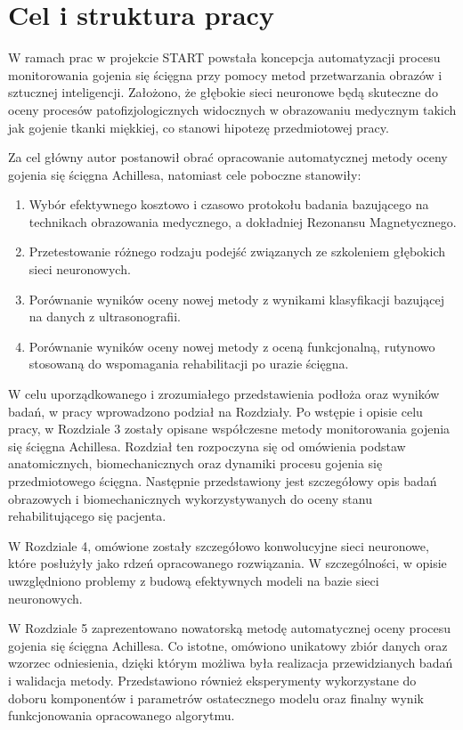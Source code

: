 {\let\clearpage\relax\chapter*{Cel i struktura pracy}}

W ramach prac w projekcie START powstała koncepcja automatyzacji procesu monitorowania gojenia się ścięgna przy pomocy metod przetwarzania obrazów i sztucznej inteligencji. Założono, że głębokie sieci neuronowe będą skuteczne do oceny procesów patofizjologicznych widocznych w obrazowaniu medycznym takich jak gojenie tkanki miękkiej, co stanowi hipotezę przedmiotowej pracy.

Za cel główny autor postanowił obrać opracowanie automatycznej metody oceny gojenia się ścięgna Achillesa, natomiast cele poboczne stanowiły:
\begin{enumerate}
	\item Wybór efektywnego kosztowo i czasowo protokołu badania bazującego na technikach obrazowania medycznego, a dokładniej Rezonansu Magnetycznego.
	\item Przetestowanie różnego rodzaju podejść związanych ze szkoleniem głębokich sieci neuronowych.
	\item Porównanie wyników oceny nowej metody z wynikami klasyfikacji bazującej na danych z ultrasonografii.
	\item Porównanie wyników oceny nowej metody z oceną funkcjonalną, rutynowo stosowaną do wspomagania rehabilitacji po urazie ścięgna.
\end{enumerate}

W celu uporządkowanego i zrozumiałego przedstawienia podłoża oraz wyników badań, w pracy wprowadzono podział na Rozdziały. Po wstępie i opisie celu pracy, w Rozdziale 3 zostały opisane współczesne metody monitorowania gojenia się ścięgna Achillesa. Rozdział ten rozpoczyna się od omówienia podstaw anatomicznych, biomechanicznych oraz dynamiki procesu gojenia się przedmiotowego ścięgna. Następnie przedstawiony jest szczegółowy opis badań obrazowych i biomechanicznych wykorzystywanych do oceny stanu rehabilitującego się pacjenta. 

W Rozdziale 4, omówione zostały szczegółowo konwolucyjne sieci neuronowe, które posłużyły jako rdzeń opracowanego rozwiązania. W szczególności, w opisie uwzględniono problemy z budową efektywnych modeli na bazie sieci neuronowych. 

W Rozdziale 5 zaprezentowano nowatorską metodę automatycznej oceny procesu gojenia się ścięgna Achillesa. Co istotne, omówiono unikatowy zbiór danych oraz wzorzec odniesienia, dzięki którym możliwa była realizacja przewidzianych badań i walidacja metody. Przedstawiono również eksperymenty wykorzystane do doboru komponentów i parametrów ostatecznego modelu oraz finalny wynik funkcjonowania opracowanego algorytmu. 

